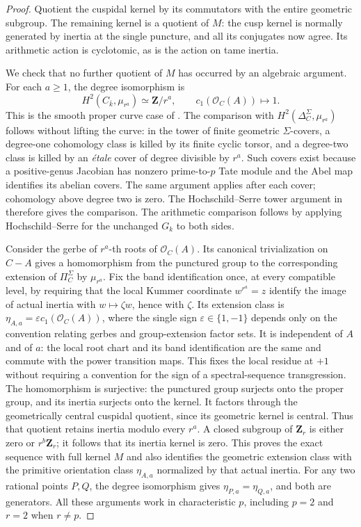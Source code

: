 \begin{proof}
Quotient the cuspidal kernel by its commutators with the entire
geometric subgroup. The remaining kernel is a quotient of $M$:
the cusp kernel is normally generated by inertia at the single
puncture, and all its conjugates now agree. Its arithmetic action
is cyclotomic, as is the action on tame inertia.

We check that no further quotient of $M$ has occurred by an
algebraic argument. For each $a\ge1$, the degree isomorphism is
\[
 H^2(C_{\bar k},\mu_{r^a})\simeq\mathbf Z/r^a,
                    \qquad c_1(\mathcal O_C(A))\longmapsto1.
\]
This is the smooth proper curve case of
\citet[Proposition 14.2 and Theorem 24.1(a)]{MilneEtale}.
The comparison with $H^2(\Delta_C^\Sigma,\mu_{r^a})$ follows
without lifting the curve: in the tower of finite geometric
$\Sigma$-covers, a degree-one cohomology class is killed by its
finite cyclic torsor, and a degree-two class is killed by an
\emph{\'etale} cover of degree divisible by $r^a$. Such covers
exist because a positive-genus Jacobian has nonzero prime-to-$p$
Tate module and the Abel map identifies its abelian covers.
The same argument applies after each cover; cohomology above
degree two is zero. The Hochschild--Serre tower argument in
\citet[Theorem 14.9 and Remark 14.10]{MilneEtale} therefore gives
the comparison. The arithmetic comparison follows by applying
Hochschild--Serre for the unchanged $G_k$ to both sides.

Consider the gerbe of $r^a$-th roots of $\mathcal O_C(A)$.
Its canonical trivialization on $C-A$ gives a homomorphism from
the punctured group to the corresponding extension of
$\Pi_C^\Sigma$ by $\mu_{r^a}$. Fix the band identification once,
at every compatible level, by requiring that the local Kummer
coordinate $w^{r^a}=z$ identify the image of actual inertia with
$w\mapsto\zeta w$, hence with $\zeta$. Its extension class is
$\eta_{A,a}=\varepsilon c_1(\mathcal O_C(A))$, where the single
sign $\varepsilon\in\{1,-1\}$ depends only on the convention
relating gerbes and group-extension factor sets. It is independent
of $A$ and of $a$: the local root chart and its band identification
are the same and commute with the power transition maps. This
fixes the local residue at $+1$ without requiring a convention for
the sign of a spectral-sequence transgression. The homomorphism
is surjective:
the punctured group surjects onto the proper group, and its
inertia surjects onto the kernel. It factors through the
geometrically central cuspidal quotient, since its geometric
kernel is central. Thus that quotient retains inertia modulo
every $r^a$. A closed subgroup of $\mathbf Z_r$ is either zero
or $r^b\mathbf Z_r$; it follows that its inertia kernel is zero.
This proves the exact sequence with full kernel $M$ and also
identifies the geometric extension class with the primitive
orientation class $\eta_{A,a}$ normalized by that actual inertia.
For any two rational points $P,Q$, the degree isomorphism gives
$\eta_{P,a}=\eta_{Q,a}$, and both are generators. All these arguments work in characteristic
$p$, including $p=2$ and $r=2$ when $r\ne p$.


\end{proof}
